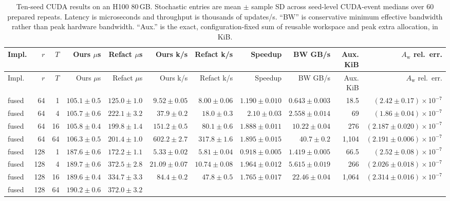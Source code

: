 \documentclass[11pt]{article}
\newcommand{\Aw}{A_{\mathrm w}}
\begin{document}
\begin{landscape}
{\scriptsize
\setlength{\tabcolsep}{1.5pt}
\begin{longtable}{@{}lrrrrrrrrrr@{}}
\caption{Ten-seed CUDA results on an H100 80\,GB.  Stochastic entries are
mean \(\pm\) sample SD across seed-level CUDA-event medians over 60 prepared
repeats.  Latency is microseconds and throughput is thousands of updates/s.
``BW'' is conservative minimum effective bandwidth rather than peak hardware
bandwidth.  ``Aux.'' is the exact, configuration-fixed sum of reusable
workspace and peak extra allocation, in KiB.}
\label{tab:e5}\\
\toprule
Impl. & \(r\) & \(T\) & Ours \(\mu\)s & Refact \(\mu\)s &
Ours k/s & Refact k/s & Speedup & BW GB/s & Aux. KiB &
\(\Aw\) rel.\ err. \\
\midrule
\endfirsthead
\toprule
Impl. & \(r\) & \(T\) & Ours \(\mu\)s & Refact \(\mu\)s &
Ours k/s & Refact k/s & Speedup & BW GB/s & Aux. KiB &
\(\Aw\) rel.\ err. \\
\midrule
\endhead
fused & 64 & 1  & \(105.1\pm0.5\) & \(125.0\pm1.0\) &
  \(9.52\pm0.05\) & \(8.00\pm0.06\) & \(1.190\pm0.010\) &
  \(0.643\pm0.003\) & 18.5 & \((2.42\pm0.17)\times10^{-7}\) \\
fused & 64 & 4  & \(105.7\pm0.6\) & \(222.1\pm3.2\) &
  \(37.9\pm0.2\) & \(18.0\pm0.3\) & \(2.10\pm0.03\) &
  \(2.558\pm0.014\) & 69 & \((1.86\pm0.04)\times10^{-7}\) \\
fused & 64 & 16 & \(105.8\pm0.4\) & \(199.8\pm1.4\) &
  \(151.2\pm0.5\) & \(80.1\pm0.6\) & \(1.888\pm0.011\) &
  \(10.22\pm0.04\) & 276 & \((2.187\pm0.020)\times10^{-7}\) \\
fused & 64 & 64 & \(106.3\pm0.5\) & \(201.4\pm1.0\) &
  \(602.2\pm2.7\) & \(317.8\pm1.6\) & \(1.895\pm0.015\) &
  \(40.7\pm0.2\) & 1,104 & \((2.191\pm0.006)\times10^{-7}\) \\
\midrule
fused & 128 & 1  & \(187.6\pm0.6\) & \(172.2\pm1.1\) &
  \(5.33\pm0.02\) & \(5.81\pm0.04\) & \(0.918\pm0.005\) &
  \(1.419\pm0.005\) & 66.5 & \((2.52\pm0.08)\times10^{-7}\) \\
fused & 128 & 4  & \(189.7\pm0.6\) & \(372.5\pm2.8\) &
  \(21.09\pm0.07\) & \(10.74\pm0.08\) & \(1.964\pm0.012\) &
  \(5.615\pm0.019\) & 266 & \((2.026\pm0.018)\times10^{-7}\) \\
fused & 128 & 16 & \(189.6\pm0.4\) & \(334.7\pm3.3\) &
  \(84.4\pm0.2\) & \(47.8\pm0.5\) & \(1.765\pm0.017\) &
  \(22.46\pm0.04\) & 1,064 & \((2.314\pm0.016)\times10^{-7}\) \\
fused & 128 & 64 & \(190.2\pm0.6\) & \(372.0\pm3.2\) &

\end{longtable}}
\end{landscape}
\end{document}
